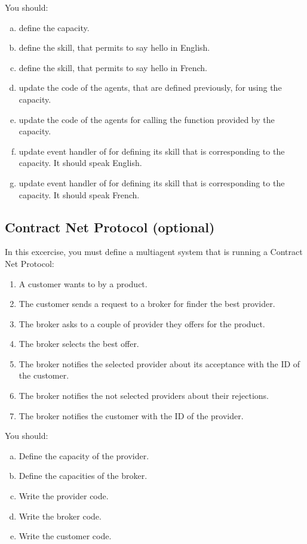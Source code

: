 \documentclass[english]{utbmciadreport}
\begin{document}
You should:
\begin{enumerate}[a)]
\item define the  capacity.
\item define the  skill, that permits to say hello in English.
\item define the  skill, that permits to say hello in French.
\item update the code of the agents, that are defined previously, for using the  capacity.
\item update the code of the agents for calling the function provided by the  capacity.
\item update  event handler of  for defining its skill that is corresponding to the  capacity. It should speak English.
\item update  event handler of  for defining its skill that is corresponding to the  capacity. It should speak French.
\end{enumerate}

\subsection{Contract Net Protocol (optional)}

In this excercise, you must define a multiagent system that is running a Contract Net Protocol:
\begin{enumerate}
\item A customer wants to by a product.
\item The customer sends a request to a broker for finder the best provider.
\item The broker asks to a couple of provider they offers for the product.
\item The broker selects the best offer.
\item The broker notifies the selected provider about its acceptance with the ID of the customer.
\item The broker notifies the not selected providers about their rejections.
\item The broker notifies the customer with the ID of the provider.
\end{enumerate}

You should:
\begin{enumerate}[a)]
\item Define the capacity of the provider.
\item Define the capacities of the broker.
\item Write the provider code.
\item Write the broker code.
\item Write the customer code.
\end{enumerate}
\end{document}
